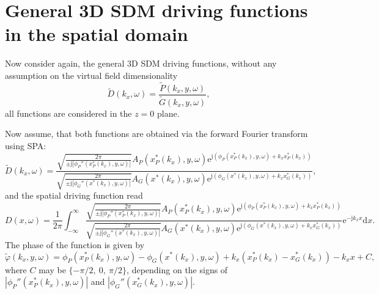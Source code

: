 \documentclass[12pt,a4paper]{article}
\newcommand{\td}{\mathrm{d}}
\newcommand{\te}{\mathrm{e}}
\newcommand{\ti}{\mathrm{j}}
\begin{document}
\section{General 3D SDM driving functions in the spatial domain}

Now consider again, the general 3D SDM driving functions, without any assumption on the virtual field dimensionality
\begin{equation}
\tilde{D}(k_x,\omega) = \frac{\tilde{P}(k_x,y,\omega)}{\tilde{G}(k_x,y,\omega)},
\end{equation}
all functions are considered in the $z=0$ plane.

Now assume, that both functions are obtained via the forward Fourier transform using SPA:
\begin{equation}
\tilde{D}(k_x,\omega) = 
\frac{
\sqrt{\frac{2\pi}{\pm \ti \left|\phi_P''(x_P^*(k_x),y,\omega) \right|}} A_P(x_P^*(k_x),y,\omega) \te^{\ti (\phi_P(x_P^*(k_x),y,\omega)+k_x x_P^*(k_x)) }
}{
\sqrt{\frac{2\pi}{\pm \ti \left|\phi_G''(x^*(k_x),y,\omega) \right|}} A_G(x^*(k_x),y,\omega) \te^{\ti (\phi_G(x^*(k_x),y,\omega)+k_x x_G^*(k_x)) }
},
\end{equation}
and the spatial driving function read
\begin{equation}
D(x,\omega) = 
\frac{1}{2\pi}\int_{-\infty}^{\infty}
\frac{
\sqrt{\frac{2\pi}{\pm \ti \left|\phi_P''(x_P^*(k_x),y,\omega) \right|}} A_P(x_P^*(k_x),y,\omega) \te^{\ti (\phi_P(x_P^*(k_x),y,\omega)+k_x x_P^*(k_x)) }
}{
\sqrt{\frac{2\pi}{\pm \ti \left|\phi_G''(x^*(k_x),y,\omega) \right|}} A_G(x^*(k_x),y,\omega) \te^{\ti (\phi_G(x^*(k_x),y,\omega)+k_x x_G^*(k_x)) }
}
\te^{-\ti k_x x} \td x.
\end{equation}
The phase of the function is given by
\begin{equation}
\tilde{\varphi}(k_x,y,\omega) = \phi_P(x_P^*(k_x),y,\omega) - \phi_G(x^*(k_x),y,\omega)  + k_x \left( x_P^*(k_x) - x_G^*(k_x) \right) -  k_x x + C,
\end{equation}
where $C$ may be $\{-\pi/2,\ 0,\ \pi/2\}$, depending on the signs of $\left|\phi_P''(x_P^*(k_x),y,\omega) \right|$ and $\left|\phi_G''(x_G^*(k_x),y,\omega) \right|$.
\end{document}
